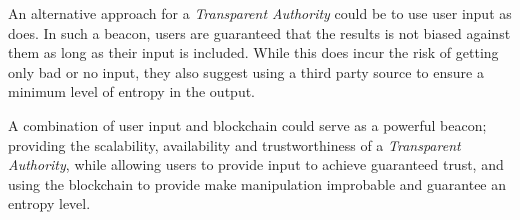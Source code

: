An alternative approach for a \emph{Transparent Authority} could be to use user input as  does.
In such a beacon, users are guaranteed that the results is not biased against them as long as their input is included.
While this does incur the risk of getting only bad or no input, they also suggest using a third party source to ensure a minimum level of entropy in the output.

A combination of user input and blockchain could serve as a powerful beacon; providing the scalability, availability and trustworthiness of a \emph{Transparent Authority}, while allowing users to provide input to achieve guaranteed trust, and using the blockchain to provide make manipulation improbable and guarantee an entropy level.
